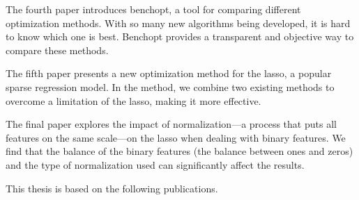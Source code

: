 \documentclass{book}
\newcommand{\PaperItitle}{The Strong Screening Rule for SLOPE}
\begin{document}
The fourth paper introduces benchopt, a tool for comparing different optimization methods. With so many new algorithms being developed, it is hard to know which one is best. Benchopt provides a transparent and objective way to compare these methods.

The fifth paper presents a new optimization method for the lasso, a popular sparse regression model. In the method, we combine two existing methods to overcome a limitation of the lasso, making it more effective.

The final paper explores the impact of normalization---a process that puts all features on the same scale---on the lasso when dealing with binary features. We find that the balance of the binary features (the balance between ones and zeros) and the type of normalization used can significantly affect the results.

\label{sec:paperlist}

This thesis is based on the following publications.

\end{document}
